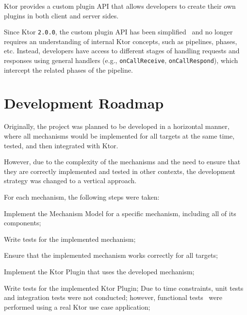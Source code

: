 Ktor provides a custom plugin API that allows developers to create their own plugins in both client and server sides.

Since Ktor \texttt{2.0.0}, the custom plugin API has been simplified~\cite{ktor-server-custom-plugins, ktor-client-custom-plugins} and no longer requires an understanding of internal Ktor concepts, such as pipelines, phases, etc.
Instead, developers have access to different stages of handling requests and responses using general handlers (e.g., \texttt{onCallReceive}, \texttt{onCallRespond}), which intercept the related phases of the pipeline.


\section{Development Roadmap}\label{sec:development-roadmap}

Originally, the project was planned to be developed in a horizontal manner, where all mechanisms would be implemented for all targets at the same time, tested, and then integrated with Ktor.

However, due to the complexity of the mechanisms and the need to ensure that they are correctly implemented and tested
in other contexts, the development strategy was changed to a vertical approach.

For each mechanism, the following steps were taken:
\begin{boldenumerate}
    \item Implement the Mechanism Model for a specific mechanism, including all of its components;
    \item Write tests for the implemented mechanism;
    \item Ensure that the implemented mechanism works correctly for all targets;
    \item Implement the Ktor Plugin that uses the developed mechanism;
    \item Write tests for the implemented Ktor Plugin;
    Due to time constraints, unit tests and integration tests were not conducted; however, functional tests~\cite{software-test-types} were performed using a real Ktor use case application;
\end{boldenumerate}
